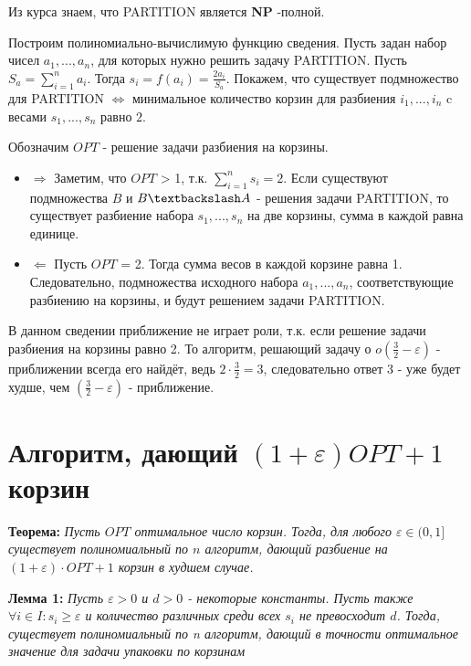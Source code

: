 \documentclass[a4paper,14pt,russian]{article}
\begin{document}
Из курса знаем, что PARTITION является {\bf NP} -полной. 

Построим полиномиально-вычислимую функцию сведения. Пусть задан набор чисел $a_1, ..., a_n$, для которых нужно решить задачу  PARTITION. Пусть $S_a = \sum_{i=1}^n a_i$. Тогда $s_i = f(a_i) = \frac{2a_i}{S_a}$. Покажем, что существует подмножество для PARTITION $\Leftrightarrow$ минимальное количество корзин для разбиения $i_1, ..., i_n$ c весами $s_1, ..., s_n$ равно $2$.

Обозначим $OPT$ - решение задачи разбиения на корзины.

\begin{itemize}
  \item $\Rightarrow$ Заметим, что $OPT$ > 1, т.к. $\sum_{i = 1}^n s_i = 2$. Если существуют подмножества $B$ и $B \textbackslash A$ - решения задачи PARTITION, то существует разбиение набора $s_1, ..., s_n$ на две корзины, сумма в каждой равна единице.
  
  \item $\Leftarrow$ Пусть $OPT$ = 2. Тогда сумма весов в каждой корзине равна 1. Следовательно, подмножества исходного набора $a_1, ..., a_n$, соответствующие разбиению на корзины, и будут решением задачи PARTITION.
  
\end{itemize}

В данном сведении приближение не играет роли, т.к. если решение задачи разбиения на корзины равно 2. То алгоритм, решающий задачу о $o(\frac{3}{2} - \varepsilon)$ - приближении всегда его найдёт, ведь $2 \cdot \frac{3}{2} = 3$, следовательно ответ 3 - уже будет худше, чем $(\frac{3}{2} - \varepsilon)$ - приближение.

\newpage
\section {Алгоритм, дающий $(1 + \varepsilon)OPT + 1$ корзин}

{\bf Теорема:} \textit{Пусть $OPT$ оптимальное число корзин. Тогда, для любого $\varepsilon \in (0, 1]$ существует полиномиальный по $n$ алгоритм, дающий разбиение на $(1 + \varepsilon) \cdot OPT + 1$ корзин в худшем случае.}

{\bf Лемма 1:} \textit{Пусть $\varepsilon > 0$ и $d > 0$ - некоторые константы. Пусть также $\forall i \in I: s_i \geq \varepsilon$ и количество различных среди всех $s_i$ не превосходит $d$. Тогда, существует полиномиальный по n алгоритм, дающий в точности оптимальное значение для задачи упаковки по корзинам}
\end{document}
